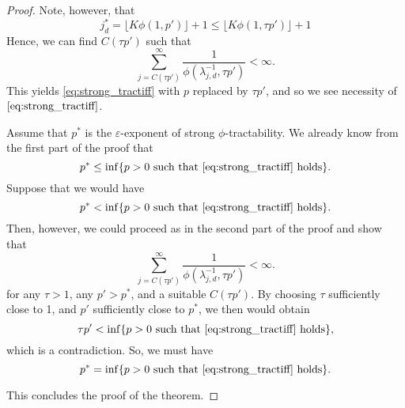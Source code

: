 \documentclass[11pt,a4paper]{article}
\begin{document}
\begin{proof}
Note, however, that 
\[
 j_d^* = \lfloor K \phi(1,p')\rfloor +1 \le \lfloor K \phi(1,\tau p')\rfloor +1
\]
Hence, we can find $C(\tau p')$ such that 
\[
 \sum_{j=C(\tau p')}^\infty \frac{1}{\phi (\lambda_{j,d}^{-1}, \tau p')}<\infty.
\]
This yields \eqref{eq:strong_tractiff} with $p$ replaced by $\tau p'$, and so we see necessity of $\eqref{eq:strong_tractiff}$. 

\bigskip

Assume that $p^*$ is the $\varepsilon$-exponent of strong $\phi$-tractability. We already know from the first part of the proof that 
\[
 p^* \le \inf\{p>0\ \mbox{such that \eqref{eq:strong_tractiff} holds}\}.
\]
Suppose that we would have 
\[
 p^* < \inf\{p>0\ \mbox{such that \eqref{eq:strong_tractiff} holds}\}.
\]
Then, however, we could proceed as in the second part of the proof and show that 
\[
 \sum_{j=C(\tau p')}^\infty \frac{1}{\phi (\lambda_{j,d}^{-1}, \tau p')}<\infty.
\]
for any $\tau>1$, any $p'>p^*$, and a suitable $C(\tau p')$. By choosing $\tau$ sufficiently close to 1, and $p'$ sufficiently close to $p^*$, we then would 
obtain 
\[
 \tau p' < \inf\{p>0\ \mbox{such that \eqref{eq:strong_tractiff} holds}\},
\]
which is a contradiction. So, we must have 
\[
 p^* = \inf\{p>0\ \mbox{such that \eqref{eq:strong_tractiff} holds}\}.
\]

This concludes the proof of the theorem. 
\end{proof}
\end{document}
